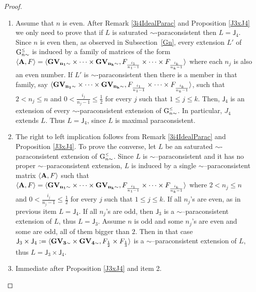 \documentclass{article}
\theoremstyle{definition}
\newcommand{\Gnsimleq}{\mathrm{G}\mystrut^{\text{\tiny $\leq$}}_{n\sim}}
\newcommand\mystrut{\rule{0pt}{7pt}}
\begin{document}
\begin{proof}

\begin{enumerate}
\item {Assume that $n$ is even. After Remark \ref{3i4IdealParac} and Proposition \ref{J3xJ4} we only need to prove that if $L$ is saturated $\sim$-paraconsistent then $L=\mathsf{J}_4$.  Since $n$ is even then, as observed in Subsection~\ref{Gn}, every extension $L'$ of $\Gnsimleq$ is induced by a family of matrices of the form $\langle {\bf A},F\rangle=\langle {\bf GV_{n_{1}\sim}\times \cdots \times GV_{n_{k}\sim}}, F_{\frac{i_{1}}{n_{1}-1}}\times\cdots\times F_{\frac{i_{k}}{n_{k}-1}}\rangle$ where each $n_j$ is also an even number.} If $L'$ is $\sim$-paraconsistent then  there is a member in that family, say $\langle {\bf GV_{n_{1}\sim}\times \cdots \times GV_{n_{k}\sim}}, F_{\frac{i_{1}}{n_{1}-1}}\times\cdots\times F_{\frac{i_{k}}{n_{k}-1}}\rangle$, such that  $2<n_{j}\leq n$ and $0<\frac{i_{j}}{n_{j}-1}\leq \frac{1}{2}$ for every $j$ such that $1\leq j\leq k$. Then,  $\mathsf{J}_4$ is an extension of every $\sim$-paraconsistent extension of $\Gnsimleq$. In particular, $J_4$ extends $L$. Thus $L=\mathsf{J}_4$, since $L$ is maximal paraconsistent.

\item The right to left implication follows from Remark \ref{3i4IdealParac} and Proposition \ref{J3xJ4}. To prove the converse, let $L$ be an saturated $\sim$-paraconsistent extension of $\Gnsimleq$. Since  $L$ is $\sim$--paraconsistent and it has no proper $\sim$--paraconsistent extension, $L$ is induced by a single $\sim$--paraconsistent matrix $\langle {\bf A},F\rangle$ such that $\langle {\bf A},F\rangle=\langle {\bf GV_{n_{1}\sim}\times \cdots \times GV_{n_{k}\sim}}, F_{\frac{i_{1}}{n_{1}-1}}\times\cdots\times F_{\frac{i_{k}}{n_{k}-1}}\rangle$ where $2<n_{j}\leq n$ and $0<\frac{i_{j}}{n_{j}-1}\leq \frac{1}{2}$ for every $j$ such that $1\leq j\leq k$.
    If all $n_{j}$'s are even, as in previous item  $L=\mathsf{J}_4$.
    If all $n_{j}$'s are odd, then $\mathsf{J}_3$ is a $\sim$--paraconsistent extension of $L$, thus $L=\mathsf{J}_3$.
    Assume $n$ is odd and some $n_{j}$'s are even and some are odd, all of them bigger than $2$. Then in that case $\mathsf{J}_3\times \mathsf{J}_4:=\langle {\bf GV_{3\sim}\times GV_{4\sim}}, F_{\frac{1}{2}}\times F_{\frac{1}{3}}\rangle$ is a $\sim$--paraconsistent extension of $L$, thus $L=\mathsf{J}_3\times \mathsf{J}_4$.
\item Immediate after Proposition \ref{J3xJ4} and item 2.
\end{enumerate}
\end{proof}
\end{document}
